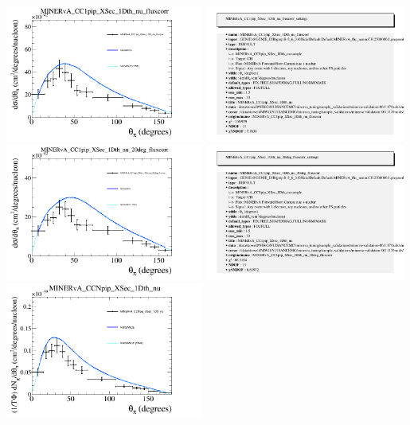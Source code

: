 \documentclass{article}
\begin{document}
\centering
\includegraphics[width=0.49\textwidth]{figures/nuisance_MINERvA_CC1pip_XSec_1Dth_nu_fluxcorr_comp.png}
\includegraphics[width=0.49\textwidth]{figures/nuisance_MINERvA_CC1pip_XSec_1Dth_nu_fluxcorr_info.png}
\centering
\includegraphics[width=0.49\textwidth]{figures/nuisance_MINERvA_CC1pip_XSec_1Dth_nu_20deg_fluxcorr_comp.png}
\includegraphics[width=0.49\textwidth]{figures/nuisance_MINERvA_CC1pip_XSec_1Dth_nu_20deg_fluxcorr_info.png}
\centering
\includegraphics[width=0.49\textwidth]{figures/nuisance_MINERvA_CCNpip_XSec_1Dth_nu_comp.png}
\end{document}
